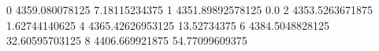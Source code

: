 0 4359.080078125 7.18115234375
1 4351.89892578125 0.0
2 4353.5263671875 1.62744140625
4 4365.42626953125 13.52734375
6 4384.5048828125 32.60595703125
8 4406.669921875 54.77099609375
